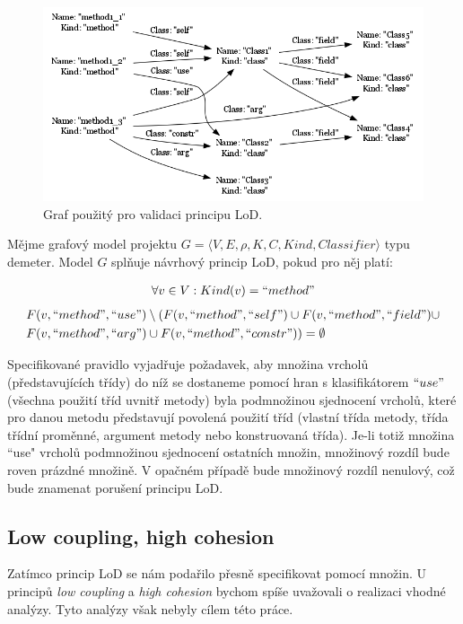 \begin{figure}[h!]
  \centering
  \includegraphics[width=1.0\textwidth]{./graphs/demeter_graph.png}
  \caption{Graf  použitý pro validaci principu LoD.\label{implementation-lod_graph}}
\end{figure}

\begin{designprinciple}
Mějme grafový model projektu $G = \langle V, E, \rho, K, C, \mathit{Kind}, \mathit{Classifier}\rangle$ typu demeter. Model $G$ splňuje návrhový princip LoD, pokud pro něj platí:

\begin{align*}
\forall v \in V: Kind(v) = ``method"\\
\end{align*}
\begin{align*}
&F(v, ``method", ``use") \setminus ( F(v, ``method", ``self") \cup F(v, ``method", ``field") \cup \\
&F(v, ``method", ``arg") \cup F(v, ``method", ``constr")) = \emptyset
\end{align*}

\end{designprinciple}

Specifikované pravidlo vyjadřuje požadavek, aby množina vrcholů (představujících třídy) do níž se dostaneme pomocí hran s klasifikátorem $``use"$ (všechna použití tříd uvnitř metody) byla podmnožinou sjednocení vrcholů, které pro danou metodu představují povolená použití tříd (vlastní třída metody, třída třídní proměnné, argument metody nebo konstruovaná třída). Je-li totiž množina ``use" vrcholů podmnožinou sjednocení ostatních množin, množinový rozdíl bude roven prázdné množině. V opačném případě bude množinový rozdíl nenulový, což bude znamenat porušení principu LoD.

\subsection{Low coupling, high cohesion}
Zatímco princip LoD se nám podařilo přesně specifikovat pomocí množin. U principů \emph{low coupling} a \emph{high cohesion} bychom spíše uvažovali o realizaci vhodné analýzy. Tyto analýzy však nebyly cílem této práce.

